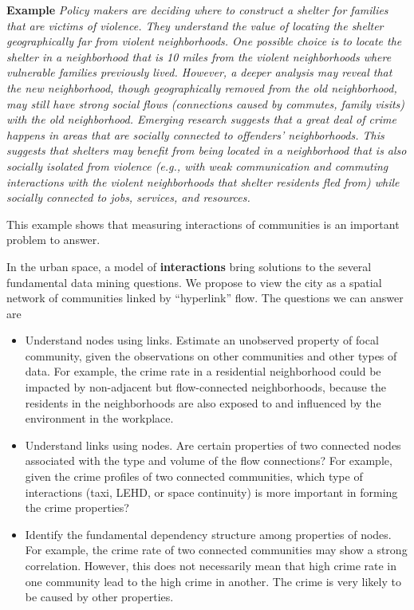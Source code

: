 \textbf{Example} \emph{Policy makers are deciding where to construct a shelter for families that are victims of violence. They understand the value of locating the shelter geographically far from violent neighborhoods. One possible choice is to locate the shelter in a neighborhood that is 10 miles from the violent neighborhoods where vulnerable families previously lived. However, a deeper analysis may reveal that the new neighborhood, though geographically removed from the old neighborhood, may still have strong social flows (connections caused by commutes, family visits) with the old neighborhood. Emerging research suggests that a great deal of crime happens in areas that are socially connected to offenders' neighborhoods. This suggests that shelters may benefit from being located in a neighborhood that is also socially isolated from violence (e.g., with weak communication and commuting interactions with the violent neighborhoods that shelter residents fled from) while socially connected to jobs, services, and resources.}


This example shows that measuring interactions of communities is an important problem to answer.


In the urban space, a model of \textbf{interactions} bring solutions to the several fundamental data mining questions. We propose to view the city as a spatial network of communities linked by ``hyperlink'' flow. The questions we can answer are
\begin{itemize}
\item Understand nodes using links. Estimate an unobserved property of focal community, given the observations on other communities and other types of data. For example, the crime rate in a residential neighborhood could be impacted by  non-adjacent but flow-connected neighborhoods, because the residents in the neighborhoods are also exposed to and influenced by the environment in the workplace.
\item Understand links using nodes. Are certain properties of two connected nodes associated with the type and volume of the flow connections? For example, given the crime profiles of two connected communities, which type of interactions (taxi, LEHD, or space continuity) is more important in forming the crime properties?
\item Identify the fundamental dependency structure among properties of nodes. For example, the crime rate of two connected communities may show a strong correlation. However, this does not necessarily mean that high crime rate in one community lead to the high crime in another. The crime is very likely to be caused by other properties. 
\end{itemize}




